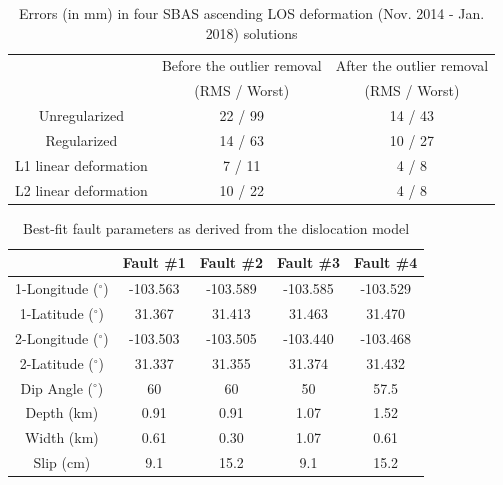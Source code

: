 \documentclass[draft,grl]{agutexSI2019}
\begin{document}
\begin{article}
\begin{table}
\caption{Errors (in mm) in four SBAS ascending LOS deformation (Nov. 2014 - Jan. 2018) solutions}
\centering
\begin{tabular}{|c|c|c|}
\hline 
      & Before the outlier removal & After the outlier removal \\
      & (RMS / Worst) & (RMS / Worst) \\
      \hline
Unregularized &  22 / 99     &  14 / 43         \\\hline
Regularized   &    14 / 63   &   10  / 27       \\\hline
L1 linear deformation          &   7 / 11      & 4 / 8      \\\hline
L2 linear deformation          &   10 / 22        & 4 / 8      \\\hline
\end{tabular}
\label{tab:compare-errors}
\end{table}

\begin{table}
\centering
\caption{Best-fit fault parameters as derived from the dislocation model}
\begin{tabular}{c|cccc}
                    & Fault \#1      & Fault \#2      & Fault \#3      & Fault \#4      \\
\hline
1-Longitude ($^{\circ}$) & -103.563 & -103.589 & -103.585 & -103.529 \\
1-Latitude ($^{\circ}$)  & 31.367   & 31.413   & 31.463   & 31.470   \\
2-Longitude ($^{\circ}$) & -103.503 & -103.505 & -103.440 & -103.468 \\
2-Latitude ($^{\circ}$)  & 31.337   & 31.355    & 31.374   & 31.432   \\
Dip Angle ($^{\circ}$)   & 60       & 60       & 50       & 57.5       \\
Depth (km)               & 0.91     & 0.91     & 1.07     & 1.52     \\
Width (km)              & 0.61     & 0.30     & 1.07     & 0.61     \\
Slip (cm)                & 9.1     & 15.2     & 9.1     & 15.2    \\
\end{tabular}
\label{tab:geo-mech-fault}
\end{table}


\end{article}
\end{document}
